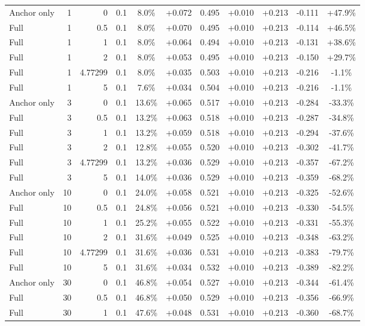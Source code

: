 \begin{table}[htbp]
\begin{tabular}{lrrrccccccc}
Anchor only & 1 & 0 & 0.1 & 8.0\% & +0.072 & 0.495 & +0.010 & +0.213 & -0.111 & +47.9\% \\
Full & 1 & 0.5 & 0.1 & 8.0\% & +0.070 & 0.495 & +0.010 & +0.213 & -0.114 & +46.5\% \\
Full & 1 & 1 & 0.1 & 8.0\% & +0.064 & 0.494 & +0.010 & +0.213 & -0.131 & +38.6\% \\
Full & 1 & 2 & 0.1 & 8.0\% & +0.053 & 0.495 & +0.010 & +0.213 & -0.150 & +29.7\% \\
Full & 1 & 4.77299 & 0.1 & 8.0\% & +0.035 & 0.503 & +0.010 & +0.213 & -0.216 & -1.1\% \\
Full & 1 & 5 & 0.1 & 7.6\% & +0.034 & 0.504 & +0.010 & +0.213 & -0.216 & -1.1\% \\
Anchor only & 3 & 0 & 0.1 & 13.6\% & +0.065 & 0.517 & +0.010 & +0.213 & -0.284 & -33.3\% \\
Full & 3 & 0.5 & 0.1 & 13.2\% & +0.063 & 0.518 & +0.010 & +0.213 & -0.287 & -34.8\% \\
Full & 3 & 1 & 0.1 & 13.2\% & +0.059 & 0.518 & +0.010 & +0.213 & -0.294 & -37.6\% \\
Full & 3 & 2 & 0.1 & 12.8\% & +0.055 & 0.520 & +0.010 & +0.213 & -0.302 & -41.7\% \\
Full & 3 & 4.77299 & 0.1 & 13.2\% & +0.036 & 0.529 & +0.010 & +0.213 & -0.357 & -67.2\% \\
Full & 3 & 5 & 0.1 & 14.0\% & +0.036 & 0.529 & +0.010 & +0.213 & -0.359 & -68.2\% \\
Anchor only & 10 & 0 & 0.1 & 24.0\% & +0.058 & 0.521 & +0.010 & +0.213 & -0.325 & -52.6\% \\
Full & 10 & 0.5 & 0.1 & 24.8\% & +0.056 & 0.521 & +0.010 & +0.213 & -0.330 & -54.5\% \\
Full & 10 & 1 & 0.1 & 25.2\% & +0.055 & 0.522 & +0.010 & +0.213 & -0.331 & -55.3\% \\
Full & 10 & 2 & 0.1 & 31.6\% & +0.049 & 0.525 & +0.010 & +0.213 & -0.348 & -63.2\% \\
Full & 10 & 4.77299 & 0.1 & 31.6\% & +0.036 & 0.531 & +0.010 & +0.213 & -0.383 & -79.7\% \\
Full & 10 & 5 & 0.1 & 31.6\% & +0.034 & 0.532 & +0.010 & +0.213 & -0.389 & -82.2\% \\
Anchor only & 30 & 0 & 0.1 & 46.8\% & +0.054 & 0.527 & +0.010 & +0.213 & -0.344 & -61.4\% \\
Full & 30 & 0.5 & 0.1 & 46.8\% & +0.050 & 0.529 & +0.010 & +0.213 & -0.356 & -66.9\% \\
Full & 30 & 1 & 0.1 & 47.6\% & +0.048 & 0.531 & +0.010 & +0.213 & -0.360 & -68.7\% \\

\end{tabular}
\end{table}
